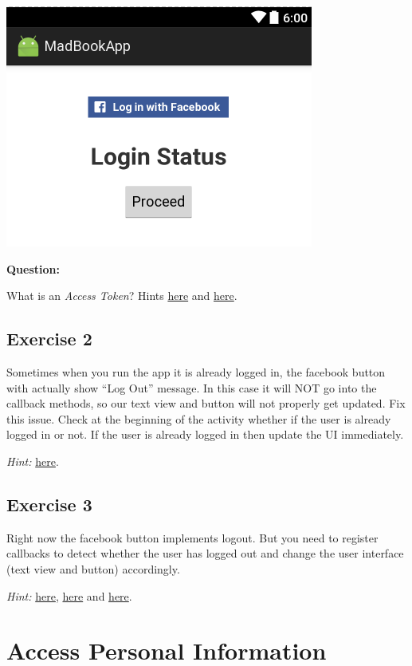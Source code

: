 \begin{center}
	\includegraphics[scale=\SourceCodeScale]{chapters/ch12/images/27}
\end{center}

\textbf{Question:} 

What is an \textit{Access Token}? Hints \href{https://developers.facebook.com/docs/facebook-login/access-tokens/}{here} and \href{https://developers.facebook.com/docs/marketing-api/authentication}{here}.

\subsection{Exercise 2}
\label{FBI:exercise2}
Sometimes when you run the app it is already logged in, the facebook button with actually show ``Log Out'' message. In this case it will NOT go into the callback methods, so our text view and button will not properly get updated. Fix this issue. Check at the beginning of the activity whether if the user is already logged in or not. If the user is already logged in then update the UI immediately.

\textit{Hint:} \href{http://stackoverflow.com/questions/29294015/how-to-check-if-user-is-logged-in-with-fb-sdk-4-0-for-android}{here}.

\subsection{Exercise 3}
\label{FBI:exercise3}
Right now the facebook button implements logout. But you need to register callbacks to detect whether the user has logged out and change the user interface (text view and button) accordingly.

\textit{Hint:} \href{http://stackoverflow.com/questions/29305232/facebook-sdk-4-for-android-how-to-log-out-programmatically}{here}, \href{http://stackoverflow.com/questions/30360068/how-to-detect-logout-event-with-the-facebook-android-api-v4}{here} and \href{http://stackoverflow.com/questions/29294015/how-to-check-if-user-is-logged-in-with-fb-sdk-4-0-for-android}{here}.

\section{Access Personal Information}
\label{FBI:accessPersonalInformation}
